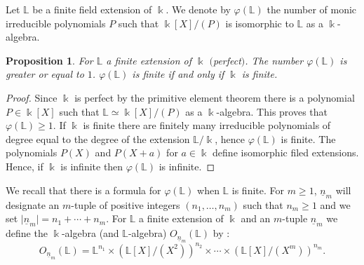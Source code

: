 \documentclass[12pt, reqno]{amsart}
\newtheorem{proposition}[theorem]{Proposition}
\newcommand{\K}{ {\Bbbk} }
\newcommand{\FL}{ {\mathbb L} }
\begin{document}
Let $\FL$ be a finite field extension of $\K$. We denote by $\varphi(\FL)$ the number of monic irreducible polynomials $P$ such that $\K[X]/(P)$ is isomorphic to $\FL$ as a $\K$-algebra. 
 
\begin{proposition}
For $\FL$ a finite extension of $\K$ $($perfect$)$. The number $\varphi(\FL)$ is greater or equal to $1$. $\varphi(\FL)$ is finite if and only if $\K$ is finite.
\end{proposition}
\begin{proof}
Since $\K$ is perfect by the primitive element theorem there is a polynomial $P\in \K[X]$ such that $\FL \simeq \K[X]/(P)$ as a $\K$-algebra. This proves that $\varphi(\FL) \geq 1$. If $\K$ is finite there are finitely many irreducible polynomials of degree equal to the degree of the extension $\FL/\K$, hence $\varphi(\FL)$ is finite. The polynomials $P(X)$ and $P(X+a)$ for $a\in \K$ define isomorphic filed extensions. Hence, if $\K$ is infinite then $\varphi(\FL)$ is infinite.   
\end{proof}
We recall that there is a formula for $\varphi(\FL)$ when $\FL$ is finite. 
For $m\geq 1$, $\underline{n}_m$ will designate an $m$-tuple of positive integers $(n_1,\dots,n_m)$ such that $n_m\geq 1$ and we set $\vert \underline{n}_m \vert=n_1+\cdots+n_m$. 
For $\FL$ a finite extension of $\K$ and an $m$-tuple $\underline{n}_m$ we define the $\K$-algebra (and $\FL$-algebra) $O_{\underline{n}_m}(\FL)$ by :
 $$O_{\underline{n}_m}(\FL)=\FL^{n_1}\times (\FL[X]/(X^2))^{n_2}\times \cdots \times (\FL[X]/(X^m))^{n_m}.$$ 
\end{document}
